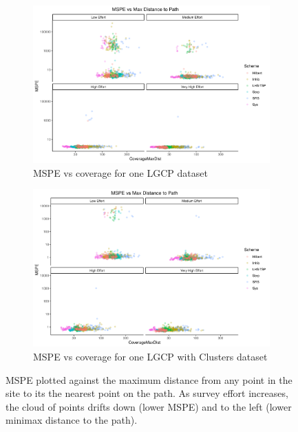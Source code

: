 \documentclass[review]{elsarticle}
\begin{document}
\begin{figure}

\begin{subfigure}{5in}
\includegraphics[width=5in]{../graphics/MSPE-Coverage-LGCP000004.png}
\caption{MSPE vs coverage for one LGCP dataset}
\label{covglgcp}
\end{subfigure}

\begin{subfigure}{5in}
\includegraphics[width=5in]{../graphics/MSPE-Coverage-Cluster000004.png}
\caption{MSPE vs coverage for one LGCP with Clusters dataset}
\label{covgclust}
\end{subfigure}

\caption{MSPE plotted against the maximum distance from any point in the site
to its the nearest point on the path. As survey effort increases, the cloud of
points drifts down (lower MSPE) and to the left (lower minimax distance to the
path).}
\label{covg}
\end{figure}
\end{document}
